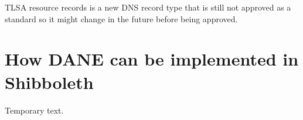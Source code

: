 
TLSA resource records is a new DNS record type that is still not approved as a standard so it might change in the future before being approved.


\section{How DANE can be implemented in Shibboleth}
Temporary text.


